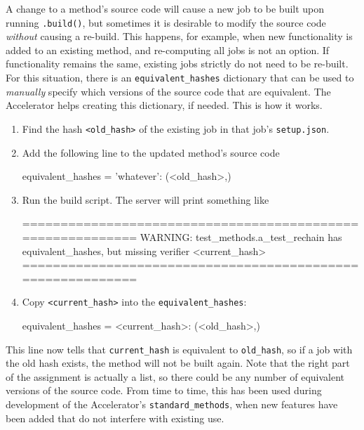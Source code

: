 A change to a method's source code will cause a new job to be built
upon running \texttt{.build()}, but sometimes it is
desirable to modify the source code \textsl{without} causing a
re-build.  This happens, for example, when new functionality is added
to an existing method, and re-computing all jobs is not an option.  If
functionality remains the same, existing jobs strictly do not need to
be re-built.  For this situation, there is an
\texttt{equivalent\_hashes} dictionary that can be used to \textsl{manually} specify
which versions of the source code that are equivalent.  The
Accelerator helps creating this dictionary, if needed.  This is how it
works.
\begin{enumerate}
\item Find the hash \texttt{<old\_hash>} of the existing job in that
  job's \texttt{setup.json}.
\item Add the following line to the updated method's source code
\begin{python}
equivalent_hashes = {'whatever': (<old_hash>,)}
\end{python}
\item Run the build script.  The server will print something like
\begin{shell}
===========================================================
WARNING: test_methods.a_test_rechain has equivalent_hashes,
but missing verifier <current_hash>
===========================================================
\end{shell}
\item Copy \texttt{<current\_hash>} into the
  \texttt{equivalent\_hashes}:
\begin{python}
equivalent_hashes = {<current_hash>: (<old_hash>,)}
\end{python}
\end{enumerate}
This line now tells that \texttt{current\_hash} is equivalent to
\texttt{old\_hash}, so if a job with the old hash exists, the method
will not be built again.  Note that the right part of the assignment
is actually a list, so there could be any number of equivalent
versions of the source code.  From time to time, this has been used
during development of the Accelerator's \texttt{standard\_methods},
when new features have been added that do not interfere with existing
use.



